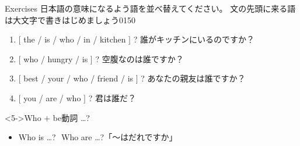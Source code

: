 \documentclass[aspectratio=169]{beamer}
\begin{document}
\begin{frame}[plain]{Exercises}
日本語の意味になるよう語を並べ替えてください。
文の先頭に来る語は大文字で書きはじめましょう\mbox{}\hfill{\tiny 0150}\,{\scriptsize {}}

 \begin{enumerate}
  \item  $[$ the / is / who / in / kitchen $]$ ? 誰がキッチンにいるのですか？\\
  \item  $[$ who / hungry / is $]$ ? 空腹なのは誰ですか？\\
  \item  $[$ best / your / who / friend / is $]$ ? あなたの親友は誰ですか？\\
  \item  $[$ you / are / who $]$ ? 君は誰だ？\\
\end{enumerate}

\begin{block}<5->{Who $+$ be動詞 \ldots ?}
 \begin{itemize}[square]
  \item Who is \ldots{}?\,\, Who are \ldots{}?\hfill{}「～はだれですか」
 \end{itemize}
\end{block}
\end{frame}
\end{document}
